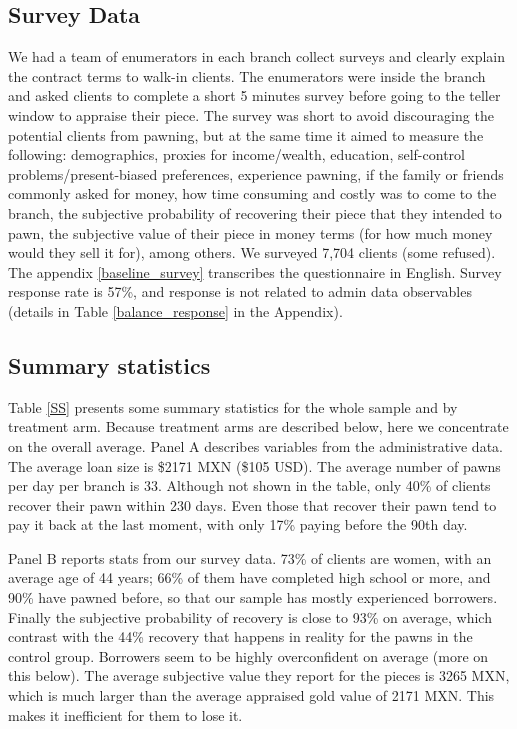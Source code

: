 \documentclass[oneside,11pt]{article}
\begin{document}
\subsection{Survey Data} 

We had a team of enumerators in each branch collect surveys and clearly explain the contract terms to walk-in clients. The enumerators were inside the branch and asked clients to complete a short 5 minutes survey before going to the teller window to appraise their piece. The survey was short to avoid discouraging the potential clients from pawning, but at the same time it aimed to measure the following: demographics, proxies for income/wealth, education, self-control problems/present-biased preferences, experience pawning, if the family or friends commonly asked for money, how time consuming and costly was to come to the branch, the subjective probability of recovering their piece that they intended to pawn, the subjective value of their piece in money terms (for how much money would they sell it for), among others. We surveyed 7,704 clients (some refused). %
The appendix \ref{baseline_survey} transcribes the questionnaire in English. Survey response rate is 57\%, and response is not related to admin data observables (details in Table \ref{balance_response} in the Appendix).


\subsection{Summary statistics}

Table \ref{SS} presents some summary statistics for the whole sample and by treatment arm. Because treatment arms are described below, here we concentrate on the overall average. Panel A describes variables from the administrative data. The average loan size is \$2171 MXN (\$105 USD). The average number of pawns per day per branch is 33. Although not shown in the table, only 40\% of clients recover their pawn within 230 days. Even those that recover their pawn tend to pay it back at the last moment, with only 17\% paying before the 90th day.

Panel B reports stats from our survey data. 73\% of clients are women, with an average age of 44 years; 66\% of them have completed high school or more, and 90\% have pawned before, so that our sample has mostly experienced borrowers. Finally the subjective probability of recovery is close to 93\% on average, which contrast with the 44\% recovery that happens in reality for the pawns in the control group. Borrowers seem to be highly overconfident on average (more on this below). The average subjective value they report for the pieces is 3265 MXN, which is much larger than the average appraised gold value of 2171 MXN. This makes it inefficient for them to lose it.
\end{document}
